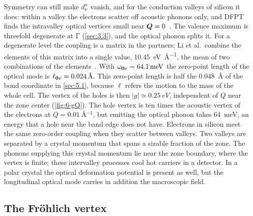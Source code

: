Symmetry can still make $d^n_\nu$ vanish, and for the conduction valleys of silicon it does: within a valley the electrons scatter off acoustic phonons only, and DFPT finds the intravalley optical vertices small near $\bm{Q} = 0$~\cite{li2021deformation}. The valence maximum is threefold degenerate at $\mathrm{\Gamma}$ (\cref{sec:3.3}), and the optical phonon splits it. For a degenerate level the coupling is a matrix in the partners; Li et al.\ combine the elements of this matrix into a single value, \SI{10.45}{eV.\angstrom^{-1}}, the mean of two combinations of the elements~\cite[Eq.~(12) and the text below it]{li2021deformation}. With $\omega_{\bm{0}\nu} = \SI{64.1}{meV}$ the zero-point length of the optical mode is $\ell_{\bm{0}\nu} = \SI{0.024}{\angstrom}$. This zero-point length is half the \SI{0.048}{\angstrom} of the bond coordinate in \cref{sec:5.1}, because $\ell$ refers the motion to the mass of the whole cell. The vertex of the holes is then $|g| \simeq \SI{0.25}{eV}$, independent of $Q$ near the zone center (\cref{fig:6-gQ}). The hole vertex is ten times the acoustic vertex of the electrons at $Q = \SI{0.01}{\angstrom^{-1}}$, but emitting the optical phonon takes \SI{64}{meV}, an energy that a hole near the band edge does not have. Electrons in silicon meet the same zero-order coupling when they scatter between valleys. Two valleys are separated by a crystal momentum that spans a sizable fraction of the zone. The phonons supplying this crystal momentum lie near the zone boundary, where the vertex is finite; these intervalley processes cool hot carriers in a detector. In a polar crystal the optical deformation potential is present as well, but the longitudinal optical mode carries in addition the macroscopic field.

\subsection{The Fr\"ohlich vertex}

